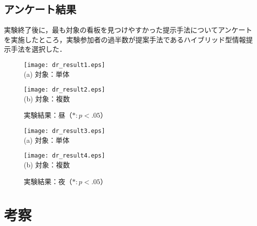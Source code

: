   \subsection{アンケート結果}
    実験終了後に，最も対象の看板を見つけやすかった提示手法についてアンケートを実施したところ，実験参加者の過半数が提案手法であるハイブリッド型情報提示手法を選択した．
  \begin{figure}[t]
      \begin{minipage}{0.49\hsize}
          \begin{center}
              \texttt{[image: dr\_result1.eps]}\\
              \small{(a) 対象：単体}
          \end{center}
      \end{minipage}
      \begin{minipage}{0.49\hsize}
          \begin{center}
              \texttt{[image: dr\_result2.eps]}\\
              \small{(b) 対象：複数}
          \end{center}
      \end{minipage}
      \vspace{2pt}
      \caption{実験結果：昼（$*:p<.05$）}
      \label{fig:result1}
  \end{figure}
  \begin{figure}[t]
      \begin{minipage}{0.49\hsize}
          \begin{center}
              \texttt{[image: dr\_result3.eps]}\\
              \small{(a) 対象：単体}
          \end{center}
      \end{minipage}
      \begin{minipage}{0.49\hsize}
          \begin{center}
              \texttt{[image: dr\_result4.eps]}\\
              \small{(b) 対象：複数}
          \end{center}
      \end{minipage}
      \vspace{2pt}
      \caption{実験結果：夜（$*:p<.05$）}
      \label{fig:result2}
  \end{figure}

\section{考察}
\label{Consideration}
